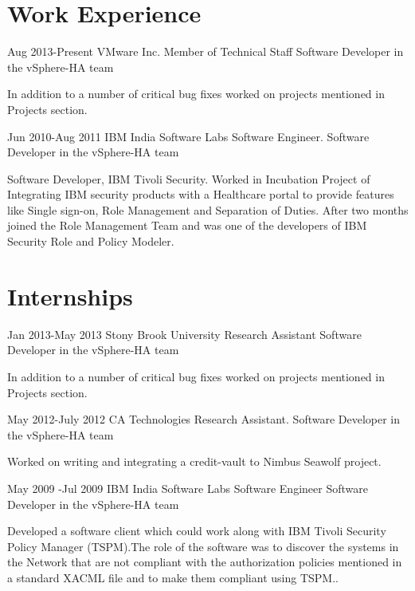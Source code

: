\documentclass[10pt]{article} %
\begin{document}
\section{Work Experience}
\job 
{Aug 2013-}{Present}
{VMware Inc.}
{Member of Technical Staff}
{Software Developer in the vSphere-HA team}
{
\begin{itemize-noindent}
\item{In addition to a number of critical bug fixes worked on projects mentioned in Projects section.}
\end{itemize-noindent}
}

\job 
{Jun 2010-}{Aug 2011}
{IBM India Software Labs}
{Software Engineer.}
{Software Developer in the vSphere-HA team}
{
\begin{itemize-noindent}
\item{Software Developer, IBM Tivoli Security. Worked in Incubation Project of Integrating IBM security products with a Healthcare portal to provide features like Single sign-on, Role Management and Separation of Duties. After two months joined the Role Management Team and was one of the developers of IBM Security Role and Policy Modeler.}
\end{itemize-noindent}
}

\section{Internships}
\job 
{Jan 2013-}{May 2013}
{Stony Brook University}
{Research Assistant}
{Software Developer in the vSphere-HA team}
{
\begin{itemize-noindent}
\item{In addition to a number of critical bug fixes worked on projects mentioned in Projects section.}
\end{itemize-noindent}
}
\job 
{May 2012-}{July 2012}
{CA Technologies}
{Research Assistant.}
{Software Developer in the vSphere-HA team}
{
\begin{itemize-noindent}
\item{Worked on writing and integrating a credit-vault to Nimbus Seawolf project.}
\end{itemize-noindent}
}
\job 
{May 2009 -}{Jul 2009}
{IBM India Software Labs}
{Software Engineer}
{Software Developer in the vSphere-HA team}
{
\begin{itemize-noindent}
\item{Developed a software client which could work along with IBM Tivoli Security Policy Manager (TSPM).The role of the software was to discover the systems in the Network that are not compliant with the authorization policies mentioned in a standard XACML file and to make them compliant using TSPM..}
\end{itemize-noindent}
}
\end{document}
